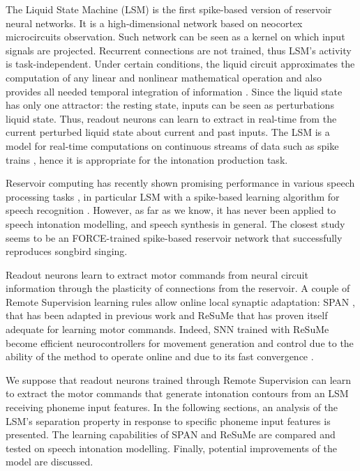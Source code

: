 \documentclass[11pt, a4paper]{article} %
\begin{document}
The Liquid State Machine (LSM) \cite{maass2002real} is the first spike-based version of reservoir neural networks. It is a high-dimensional network based on neocortex microcircuits observation. Such network can be seen as a kernel on which input signals are projected. Recurrent connections are not trained, thus LSM's activity is task-independent. 
Under certain conditions, the liquid circuit approximates the computation of any linear and nonlinear mathematical operation and also provides all needed temporal integration of information \cite{maass2011liquid}. Since the liquid state has only one attractor: the resting state, inputs can be seen as perturbations liquid state. Thus, readout neurons can learn to extract in real-time from the current perturbed liquid state about current and past inputs. The LSM is a model for real-time computations on continuous streams of data such as spike trains \cite{maass2011liquid}, hence it is appropriate for the intonation production task.

Reservoir computing has recently shown promising performance in various speech processing tasks \cite{triefenbach2014large, triefenbach2010phoneme, ikeda2018short, zhao2018nonlinear}, in particular LSM with a spike-based learning algorithm for speech recognition \cite{zhang2015digital}. However, as far as we know, it has never been applied to speech intonation modelling, and speech synthesis in general. The closest study seems to be an FORCE-trained spike-based reservoir network \cite{nicola2016supervised} that successfully reproduces songbird singing.

Readout neurons learn to extract motor commands from neural circuit information through the plasticity of connections from the reservoir. A couple of Remote Supervision learning rules allow online local synaptic adaptation: SPAN \cite{mohemmed2012span, mohemmed2013training}, that has been adapted in previous work \cite{schnell2018neural} and ReSuMe \cite{ponulak2006supervised, ponulak2010supervised} that has proven itself adequate for learning motor commands. Indeed, SNN trained with ReSuMe become efficient neurocontrollers for movement generation and control due to the ability of the method to operate online and due to its fast convergence \cite{ponulak2010supervised}.

We suppose that readout neurons trained through Remote Supervision can learn to extract the motor commands that generate intonation contours from an LSM receiving phoneme input features. In the following sections, an analysis of the LSM's separation property in response to specific phoneme input features is presented. The learning capabilities of SPAN and ReSuMe are compared and tested on speech intonation modelling. Finally, potential improvements of the model are discussed.
\end{document}
